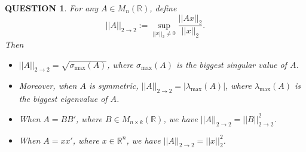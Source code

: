 \documentclass[12pt]{article}
\renewcommand{\(}{\left(}%
\renewcommand{\)}{\right)}%
\renewcommand{\[}{\left[}%
\renewcommand{\]}{\right]}%
\renewcommand{\r}{\mathbb{R}}
\newtheorem{question}{QUESTION}[section]}
\begin{document}
\begin{question}
	For any $A\in M_n(\r)$, define
	\begin{equation*}
		||A||_{2\to 2}:=\sup_{||x||_2\neq 0}\frac{||Ax||_2}{||x||_2}.
	\end{equation*}
	Then 
	\begin{itemize}
		\item $||A||_{2\to 2}=\sqrt{\sigma_{\max}(A)}$, where $\sigma_{\max}(A)$ is the biggest singular value of $A$. 
		\item Moreover, when $A$ is symmetric, $||A||_{2\to 2}=|\lambda_{ \max}(A)|$, where $\lambda_{ \max}(A)$ is the biggest eigenvalue of $A$. 
		\item When $A=BB'$, where $B\in M_{n\times k}(\r)$, we have $||A||_{2\to 2}=||B||_{2\to 2}^2$. 
		\item When $A=xx'$, where $x\in \r^n$, we have $||A||_{2\to 2}=||x||_2^2$.
	\end{itemize}
\end{question}
\end{document}
